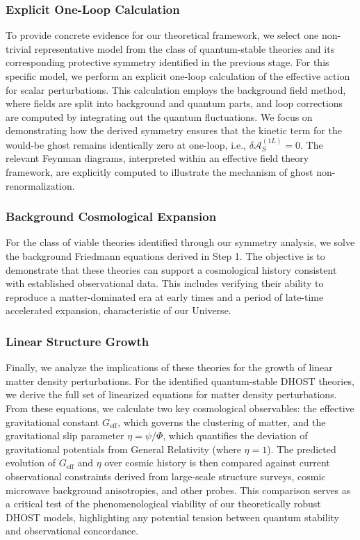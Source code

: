 \documentclass[twocolumn]{aastex631}
\begin{document}
\subsubsection{Explicit One-Loop Calculation}
To provide concrete evidence for our theoretical framework, we select one non-trivial representative model from the class of quantum-stable theories and its corresponding protective symmetry identified in the previous stage. For this specific model, we perform an explicit one-loop calculation of the effective action for scalar perturbations. This calculation employs the background field method, where fields are split into background and quantum parts, and loop corrections are computed by integrating out the quantum fluctuations. We focus on demonstrating how the derived symmetry ensures that the kinetic term for the would-be ghost remains identically zero at one-loop, i.e., $\delta\mathcal{A}_S^{(1L)}=0$. The relevant Feynman diagrams, interpreted within an effective field theory framework, are explicitly computed to illustrate the mechanism of ghost non-renormalization.

\subsubsection{Background Cosmological Expansion}
For the class of viable theories identified through our symmetry analysis, we solve the background Friedmann equations derived in Step 1. The objective is to demonstrate that these theories can support a cosmological history consistent with established observational data. This includes verifying their ability to reproduce a matter-dominated era at early times and a period of late-time accelerated expansion, characteristic of our Universe.

\subsubsection{Linear Structure Growth}
Finally, we analyze the implications of these theories for the growth of linear matter density perturbations. For the identified quantum-stable DHOST theories, we derive the full set of linearized equations for matter density perturbations. From these equations, we calculate two key cosmological observables: the effective gravitational constant $G_{\text{eff}}$, which governs the clustering of matter, and the gravitational slip parameter $\eta = \psi/\Phi$, which quantifies the deviation of gravitational potentials from General Relativity (where $\eta=1$). The predicted evolution of $G_{\text{eff}}$ and $\eta$ over cosmic history is then compared against current observational constraints derived from large-scale structure surveys, cosmic microwave background anisotropies, and other probes. This comparison serves as a critical test of the phenomenological viability of our theoretically robust DHOST models, highlighting any potential tension between quantum stability and observational concordance.
\end{document}
